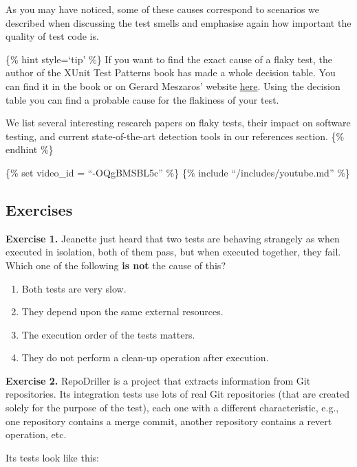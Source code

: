 As you may have noticed, some of these causes correspond to scenarios we
described when discussing the test smells and emphasise again how
important the quality of test code is.

\{\% hint style=`tip' \%\} If you want to find the exact cause of a
flaky test, the author of the XUnit Test Patterns book has made a whole
decision table. You can find it in the book or on Gerard Meszaros'
website \href{http://xunitpatterns.com/Erratic\%20Test.html}{here}.
Using the decision table you can find a probable cause for the flakiness
of your test.

We list several interesting research papers on flaky tests, their impact
on software testing, and current state-of-the-art detection tools in our
references section. \{\% endhint \%\}

\{\% set video\_id = ``-OQgBMSBL5c'' \%\} \{\% include
``/includes/youtube.md'' \%\}

\hypertarget{exercises}{%
\subsection{Exercises}\label{exercises}}

\textbf{Exercise 1.} Jeanette just heard that two tests are behaving
strangely as when executed in isolation, both of them pass, but when
executed together, they fail. Which one of the following \textbf{is not}
the cause of this?

\begin{enumerate}
\def\labelenumi{\arabic{enumi}.}
\tightlist
\item
  Both tests are very slow.
\item
  They depend upon the same external resources.
\item
  The execution order of the tests matters.
\item
  They do not perform a clean-up operation after execution.
\end{enumerate}

\textbf{Exercise 2.} RepoDriller is a project that extracts information
from Git repositories. Its integration tests use lots of real Git
repositories (that are created solely for the purpose of the test), each
one with a different characteristic, e.g., one repository contains a
merge commit, another repository contains a revert operation, etc.

Its tests look like this:

